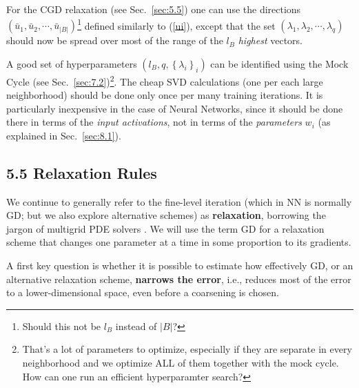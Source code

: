 \documentclass{article} %
\begin{document}
For the CGD relaxation (see Sec.~\ref{sec:5.5}) one can use the directions $(\bar{u}_1, \bar{u}_2, \cdots, \bar{u}_{|B|})$\footnote{Should this not be $l_B$ instead of $|B|$?} defined similarly to (\ref{ui}), except that the set $(\lambda_1, \lambda_2, \cdots, \lambda_q)$ should now be spread over most of the range of the $l_B$ {\it highest} vectors.

A good set of hyperparameters $(l_B, q, \left\{\lambda_i\right\}_i)$ can be identified using the Mock Cycle (see Sec.~\ref{sec:7.2})\footnote{That's a lot of parameters to optimize, especially if they are separate in every neighborhood and we optimize ALL of them together with the mock cycle. How can one run an efficient hyperparamter search?}. The cheap SVD calculations (one per each large neighborhood) should be done only once per many training iterations. It is particularly inexpensive in the case of Neural Networks, since it should be done there in terms of the {\it input activations}, not in terms of the {\it parameters} $w_i$ (as explained in Sec.~\ref{sec:8.1}).

\subsection{5.5 Relaxation Rules}
\label{sec:relaxation_rules}
We continue to generally refer to the fine-level iteration (which in NN is normally GD; but we also explore alternative schemes) as \textbf{relaxation}, borrowing the jargon of multigrid PDE solvers \cite[Sec.~1]{guide}. We will use the term GD for a relaxation scheme that changes one parameter at a time in some proportion to its gradients. 

A first key question is whether it is possible to estimate how effectively GD, or an alternative relaxation scheme, \textbf{narrows the error}, i.e., reduces most of the error to a lower-dimensional space, even before a coarsening is chosen. 
\end{document}
